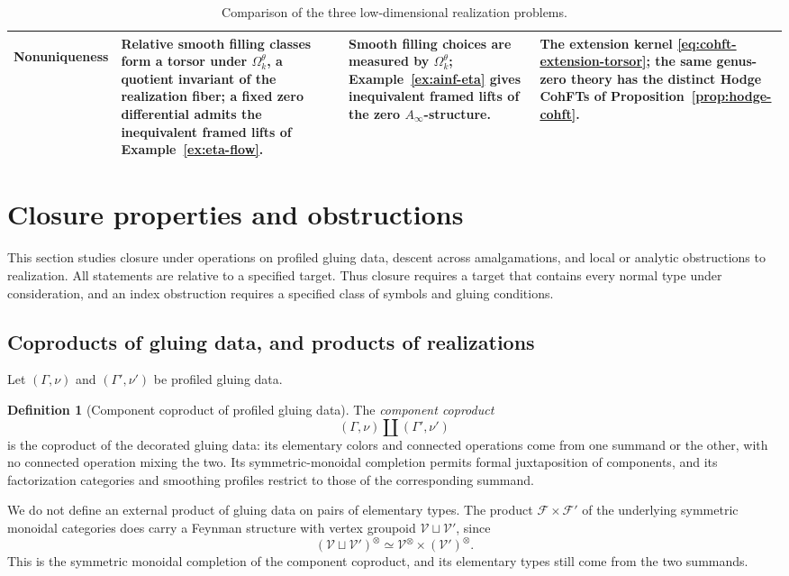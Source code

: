 \documentclass[11pt,letterpaper,twoside]{article}
\theoremstyle{plain}
\theoremstyle{definition}
\newtheorem{definition}[theorem]{Definition}
\theoremstyle{remark}
\newcommand{\Ainf}{A_\infty}
\begin{document}
\begin{table}[p]
\begin{tabularx}{\textwidth}{@{}>{\bfseries\raggedright\arraybackslash}p{}>{\raggedright\arraybackslash}X>{\raggedright\arraybackslash}X>{\raggedright\arraybackslash}X@{}}
Nonuniqueness & Relative smooth filling classes form a torsor under \(\Omega^\theta_k\), a quotient invariant of the realization fiber; a fixed zero differential admits the inequivalent framed lifts of Example~\ref{ex:eta-flow}. & Smooth filling choices are measured by \(\Omega^\theta_k\); Example~\ref{ex:ainf-eta} gives inequivalent framed lifts of the zero \(\Ainf\)-structure. & The extension kernel \eqref{eq:cohft-extension-torsor}; the same genus-zero theory has the distinct Hodge CohFTs of Proposition~\ref{prop:hodge-cohft}. \\
\bottomrule
\end{tabularx}
\caption{Comparison of the three low-dimensional realization problems.}
\label{tab:forced-chosen}
\end{table}

\section{Closure properties and obstructions}\label{sec:nogo}

This section studies closure under operations on profiled gluing data, descent across amalgamations, and local or analytic obstructions to realization.  All statements are relative to a specified target.  Thus closure requires a target that contains every normal type under consideration, and an index obstruction requires a specified class of symbols and gluing conditions.

\subsection{Coproducts of gluing data, and products of realizations}

Let \((\Gamma,\nu)\) and \((\Gamma',\nu')\) be profiled gluing data.

\begin{definition}[Component coproduct of profiled gluing data]\label{def:profiled-products}
The \emph{component coproduct}
\[
 (\Gamma,\nu)\amalg(\Gamma',\nu')
\]
is the coproduct of the decorated gluing data: its elementary colors and connected operations come from one summand or the other, with no connected operation mixing the two.  Its symmetric-monoidal completion permits formal juxtaposition of components, and its factorization categories and smoothing profiles restrict to those of the corresponding summand.
\end{definition}

We do not define an external product of gluing data on pairs of elementary types.  The product \(\mathcal F\times\mathcal F'\) of the underlying symmetric monoidal categories does carry a Feynman structure with vertex groupoid \(\mathcal V\sqcup\mathcal V'\), since
\[
 (\mathcal V\sqcup\mathcal V')^{\otimes}
 \simeq \mathcal V^{\otimes}\times(\mathcal V')^{\otimes}.
\]
This is the symmetric monoidal completion of the component coproduct, and its elementary types still come from the two summands.
\end{document}
